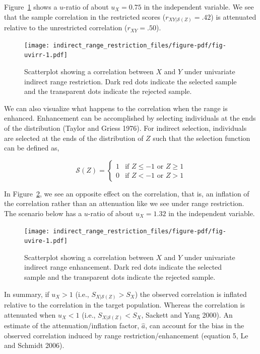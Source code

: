 \documentclass[
  letterpaper,
  DIV=11,
  numbers=noendperiod]{scrreprt}
\begin{document}
Figure~\ref{fig-uvirr} shows a \(u\)-ratio of about \(u_X=0.75\) in the
independent variable. We see that the sample correlation in the
restricted scores (\(r_{XY|\mathcal{S}(Z)}=.42\)) is attenuated relative
to the unrestricted correlation (\(r_{XY}=.50\)).

\begin{figure}[H]

{\centering \texttt{[image: indirect\_range\_restriction\_files/figure-pdf/fig-uvirr-1.pdf]}

}

\caption{\label{fig-uvirr}Scatterplot showing a correlation between
\(X\) and \(Y\) under univariate indirect range restriction. Dark red
dots indicate the selected sample and the transparent dots indicate the
rejected sample.}

\end{figure}

We can also visualize what happens to the correlation when the range is
enhanced. Enhancement can be accomplished by selecting individuals at
the ends of the distribution (Taylor and Griess 1976). For indirect
selection, individuals are selected at the ends of the distribution of
\(Z\) such that the selection function can be defined as,

\[
\mathcal{S}(Z) = \begin{cases} 1 & \text{if } Z \leq -1 \text{ or } Z \geq 1 \\ 0 & \text{if } Z < -1 \text{ or } Z >1 \end{cases}
\]

In Figure~\ref{fig-uvire}, we see an opposite effect on the correlation,
that is, an inflation of the correlation rather than an attenuation like
we see under range restriction. The scenario below has a \(u\)-ratio of
about \(u_X=1.32\) in the independent variable.

\begin{figure}[H]

{\centering \texttt{[image: indirect\_range\_restriction\_files/figure-pdf/fig-uvire-1.pdf]}

}

\caption{\label{fig-uvire}Scatterplot showing a correlation between
\(X\) and \(Y\) under univariate indirect range enhancement. Dark red
dots indicate the selected sample and the transparent dots indicate the
rejected sample.}

\end{figure}

In summary, if \(u_X>1\) (i.e., \(S_{X|\mathcal{S}(Z)}>S_{X}\)) the
observed correlation is inflated relative to the correlation in the
target population. Whereas the correlation is attenuated when \(u_X<1\)
(i.e., \(S_{X|\mathcal{S}(Z)}<S_{X}\), Sackett and Yang 2000). An
estimate of the attenuation/inflation factor, \(\hat{a}\), can account
for the bias in the observed correlation induced by range
restriction/enhancement (equation 5, Le and Schmidt 2006).
\end{document}
